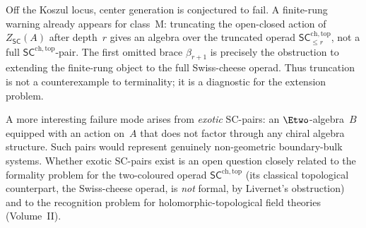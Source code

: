 \begin{remark}
\label{rem:center-surjectivity-failure}
Off the Koszul locus, center generation is conjectured to fail. A
finite-rung warning already appears for class~M: truncating the
open-closed action of $Z_{\mathsf{SC}}(A)$ after depth~$r$ gives an
algebra over the truncated operad
$\mathsf{SC}^{\mathrm{ch,top}}_{\le r}$, not a full
$\mathsf{SC}^{\mathrm{ch,top}}$-pair. The first omitted brace
$\beta_{r+1}$ is precisely the obstruction to extending the
finite-rung object to the full Swiss-cheese operad. Thus truncation
is not a counterexample to terminality; it is a diagnostic for the
extension problem.

A more interesting failure mode arises from \emph{exotic}
SC-pairs: an $\Etwo$-algebra~$B$ equipped with an action
on~$A$ that does not factor through any chiral algebra
structure. Such pairs would represent genuinely
non-geometric boundary-bulk systems. Whether exotic
SC-pairs exist is an open question closely related to the
formality problem for the two-coloured operad
$\mathsf{SC}^{\mathrm{ch,top}}$ \textup{(}its classical
topological counterpart, the Swiss-cheese operad, is \emph{not}
formal, by Livernet's obstruction\textup{)} and to the recognition
problem for holomorphic-topological field theories
(Volume~II).
\end{remark}

